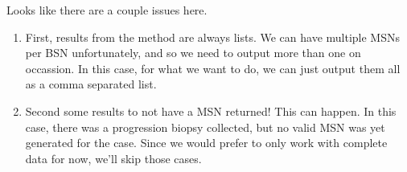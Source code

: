 \documentclass[letterpaper,10pt,english]{sphinxmanual}
\begin{document}
%
\begin{sphinxVerbatim}[commandchars=\\\{\}]
   \PYG{p}{[}\PYG{p}{]}
      
      
       
\end{sphinxVerbatim}

Looks like there are a couple issues here.
\begin{enumerate}
\item {} 
First, results from the  method are always lists.  We can have
multiple MSNs per BSN unfortunately, and so we need to output more than one
on occassion.  In this case, for what we want to do, we can just output them
all as a comma separated list.

\item {} 
Second some results to not have a MSN returned!  This can happen.  In this
case, there was a progression biopsy collected, but no valid MSN was yet
generated for the case.  Since we would prefer to only work with complete
data for now, we’ll skip those cases.

\end{enumerate}
\end{document}
